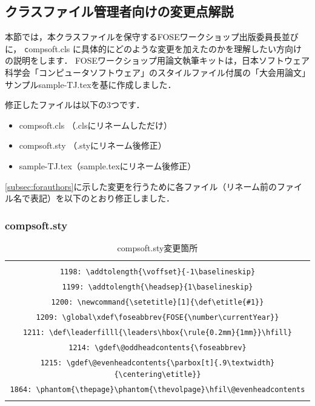 \documentclass[T,J]{fose} %
\begin{document}
\subsection{クラスファイル管理者向けの変更点解説} \label{sec:differences}
本節では，本クラスファイルを保守するFOSEワークショップ出版委員長並びに， {\texttt compsoft.cls} に具体的にどのような変更を加えたのかを理解したい方向けの説明をします．
FOSEワークショップ用論文執筆キットは，日本ソフトウェア科学会「コンピュータソフトウェア」のスタイルファイル付属の「大会用論文」サンプルsample-TJ.texを基に作成しました．

修正したファイルは以下の3つです．
\begin{itemize}
	\item compsoft.cls （\MakeLowercase{\foseabbrev}.clsにリネームしただけ）
	\item compsoft.sty （\MakeLowercase{\foseabbrev}.styにリネーム後修正）
	\item sample-TJ.tex（sample.texにリネーム後修正）
\end{itemize}

\ref{subsec:forauthors}に示した変更を行うために各ファイル（リネーム前のファイル名で表記）を以下のとおり修正しました．


\subsubsection*{compsoft.sty}
\begin{table}[t]
\caption{compsoft.sty変更箇所}
\label{table:change1}
 	\begin{tabular}{c}
		\begin{tabularx}{47zw}{X}
		\hline
		\verb|1196: \def\leaderfilll{\leaders\hbox{\rule{0.2mm}{1mm}}\hfill}| \\
		\verb|1198: \addtolength{\voffset}{-1\baselineskip}| \\
		\verb|1199: \addtolength{\headsep}{1\baselineskip}| \\
		\verb|1200: \newcommand{\setetitle}[1]{\def\etitle{#1}}| \\
		\verb|1209: \global\xdef\foseabbrev{FOSE{\number\currentYear}}| \\
		\verb|1211: \def\leaderfilll{\leaders\hbox{\rule{0.2mm}{1mm}}\hfill}| \\
		\verb|1214: \gdef\@oddheadcontents{\foseabbrev}| \\
		\verb|1215: \gdef\@evenheadcontents{\parbox[t]{.9\textwidth}{\centering\etitle}}| \\
		\verb|1864: \phantom{\thepage}\phantom{\thevolpage}\hfil\@evenheadcontents| \\
		\hline
		\end{tabularx}
	\end{tabular}
\end{table}
\end{document}
